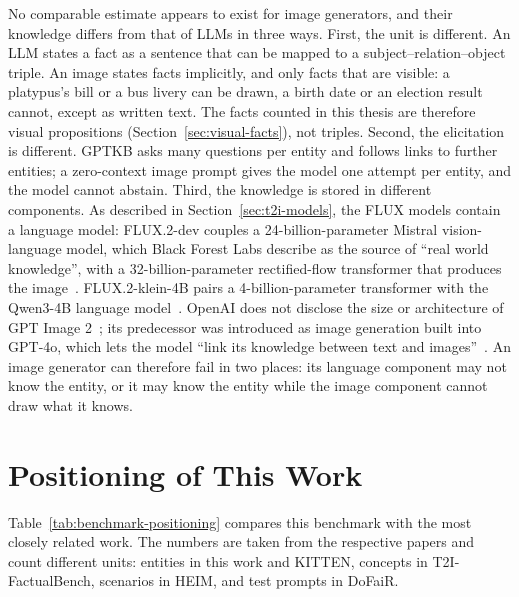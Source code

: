 No comparable estimate appears to exist for image generators, and their
knowledge differs
from that of LLMs in three ways. First, the unit is different. An LLM states a
fact as a sentence that can be mapped to a subject--relation--object triple. An
image states facts implicitly, and only facts that are visible: a platypus's
bill or a bus livery can be drawn, a birth date or an election result cannot,
except as written text. The facts counted in this thesis are therefore visual
propositions (Section~\ref{sec:visual-facts}), not triples. Second, the
elicitation is different. GPTKB asks many questions per entity and follows links
to further entities; a zero-context image prompt gives the model one attempt per
entity, and the model cannot abstain. Third, the knowledge is stored in
different components. As described in Section~\ref{sec:t2i-models}, the FLUX
models contain a language model:
FLUX.2-dev couples a 24-billion-parameter Mistral vision-language model, which
Black Forest Labs describe as the source of ``real world knowledge'', with a
32-billion-parameter rectified-flow transformer that produces the
image~\citep{flux2}. FLUX.2-klein-4B pairs a 4-billion-parameter transformer
with the Qwen3-4B language model~\citep{flux2klein}. OpenAI does not disclose
the size or architecture of GPT Image 2~\citep{gptimage2}; its predecessor was
introduced as image generation built into GPT-4o, which lets the model ``link
its knowledge between text and images''~\citep{openai4oimage}. An image
generator can therefore fail in two places: its language component may not know
the entity, or it may know the entity while the image component cannot draw
what it knows.

\section{Positioning of This Work}
\label{sec:positioning}

Table~\ref{tab:benchmark-positioning} compares this benchmark with the most
closely related work. The numbers are taken from the respective papers and
count different units: entities in this work and KITTEN, concepts in
T2I-FactualBench, scenarios in HEIM, and test prompts in DoFaiR.

